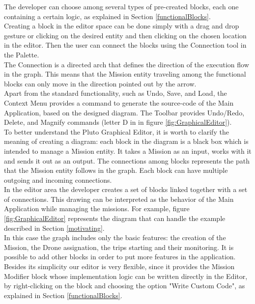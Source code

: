 The developer can choose among several types of pre-created blocks, each one containing a certain logic, as explained in Section \ref{functionalBlocks}. 
\\
Creating a block in the editor space can be done simply with a drag and drop gesture or clicking on the desired entity and then clicking on the chosen location in the editor. Then the user can connect the blocks using the Connection tool in the Palette.
\\
The Connection is a directed arch that defines the direction of the execution flow in the graph. This means that the Mission entity traveling among the functional blocks can only move in the direction pointed out by the arrow.
\\
 
Apart from the standard functionality, such as Undo, Save, and Load, the Context Menu provides a command to generate the source-code of the Main Application, based on the designed diagram. The Toolbar provides Undo/Redo, Delete, and Magnify commands (letter D in in figure \ref{fig:GraphicalEditor}).
\\

To better understand the Pluto Graphical Editor, it is worth to clarify the meaning of creating a diagram:
each block in the diagram is a black box which is intended to manage a Mission entity. 
It takes a Mission as an input, works with it and sends it out as an output.
The connections among blocks represents the path that the Mission entity follows in the graph.
Each block can have multiple outgoing and incoming connections.
\\

In the editor area the developer creates a set of blocks linked together with a set of connections. This drawing can be interpreted as the behavior of the Main Application while managing the missions.
For example, figure \ref{fig:GraphicalEditor} represents the diagram that can handle the example described in Section \ref{motivating}.
\\
In this case the graph includes only the basic features: the creation of the Mission, the Drone assignation, the trips starting and their monitoring. 
It is possible to add other blocks in order to put more features in the application.
\\

Besides its simplicity our editor is very flexible, since it provides the Mission Modifier block whose implementation logic can be written directly in the Editor, by right-clicking on the block and choosing the option "Write Custom Code", as explained in Section \ref{functionalBlocks}.


